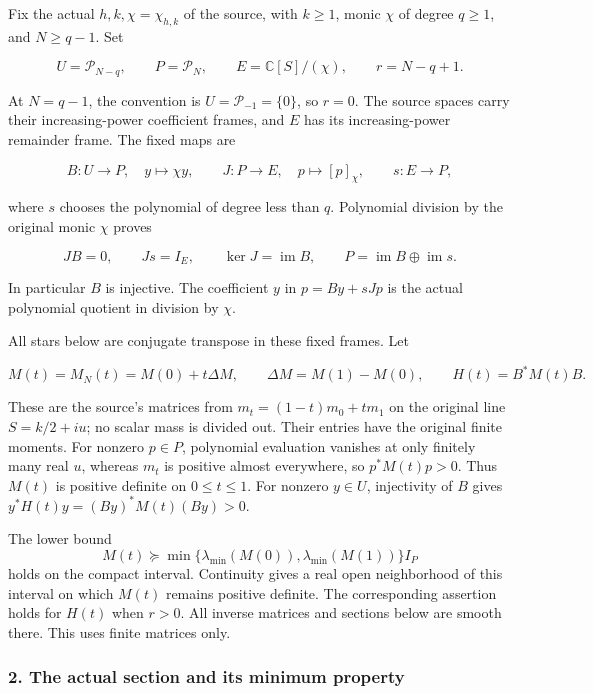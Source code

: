 \documentclass{article}
\begin{document}
Fix the actual \(h,k,\chi=\chi_{h,k}\) of the source, with \(k\ge1\), monic \(\chi\) of degree \(q\ge1\), and \(N\ge q-1\). Set

\[
U=\mathcal P_{N-q},\qquad P=\mathcal P_N,\qquad
E=\mathbb C[S]/(\chi),\qquad r=N-q+1.
\tag{AV1}
\]

At \(N=q-1\), the convention is \(U=\mathcal P_{-1}=\{0\}\), so \(r=0\). The source spaces carry their increasing-power coefficient frames, and \(E\) has its increasing-power remainder frame. The fixed maps are

\[
B:U\longrightarrow P,\quad y\longmapsto\chi y,\qquad
J:P\longrightarrow E,\quad p\longmapsto[p]_\chi,\qquad
s:E\longrightarrow P,
\tag{AV2}
\]

where \(s\) chooses the polynomial of degree less than \(q\). Polynomial division by the original monic \(\chi\) proves

\[
JB=0,\qquad Js=I_E,\qquad
\ker J=\operatorname{im}B,\qquad
P=\operatorname{im}B\oplus\operatorname{im}s.
\tag{AV3}
\]

In particular \(B\) is injective. The coefficient \(y\) in \(p=By+sJp\) is the actual polynomial quotient in division by \(\chi\).

All stars below are conjugate transpose in these fixed frames. Let

\[
M(t)=M_N(t)=M(0)+t\Delta M,\qquad
\Delta M=M(1)-M(0),\qquad H(t)=B^*M(t)B.
\tag{AV4}
\]

These are the source's matrices from \(m_t=(1-t)m_0+tm_1\) on the original line \(S=k/2+iu\); no scalar mass is divided out. Their entries have the original finite moments. For nonzero \(p\in P\), polynomial evaluation vanishes at only finitely many real \(u\), whereas \(m_t\) is positive almost everywhere, so \(p^*M(t)p>0\). Thus \(M(t)\) is positive definite on \(0\le t\le1\). For nonzero \(y\in U\), injectivity of \(B\) gives \(y^*H(t)y=(By)^*M(t)(By)>0\).

The lower bound \[
M(t)\succeq
\min\{\lambda_{\min}(M(0)),\lambda_{\min}(M(1))\}I_P
\] holds on the compact interval. Continuity gives a real open neighborhood of this interval on which \(M(t)\) remains positive definite. The corresponding assertion holds for \(H(t)\) when \(r>0\). All inverse matrices and sections below are smooth there. This uses finite matrices only.

\subsubsection{2. The actual section and its minimum property}\label{endpoint-variation_review--the-actual-section-and-its-minimum-property}
\end{document}
